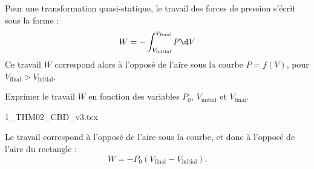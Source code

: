 \finEntrainement












\hauteurLargeurCadreReponse		{8mm}{5cm}
\initialisationEntrainement

Pour une transformation quasi-statique, le travail des forces de pression s'écrit sous la forme : $$W=- \int_{V_{\text{initial}}}^{V_{\text{final}}} P \d V$$
Ce travail $W$ correspond alors à l'opposé de l'aire sous la courbe $P = f(V)$, pour $V_{\text{final}} > V_{\text{initial}}$.

\debutEntrainement



\begin{enonce}
Exprimer le travail $W$ en fonction des variables $P_0$, $V_{\text{initial}}$ et $V_{\text{final}}$.
\begin{center}
{1_THM02_CBD_v3.tex}
\end{center}
\end{enonce}


\begin{corrige}
Le travail correspond à l'opposé de l'aire sous la courbe, et donc à l'opposé de l'aire du rectangle : \minusSmallskip
\[
W=  -P_0 (V_{\text{final}}-V_{\text{initial}}).
\]
\end{corrige}

